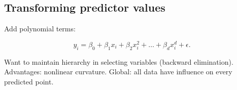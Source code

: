 \subsection{Transforming predictor values}

Add polynomial terms:

\[
y_i = \beta_0 + \beta_1 x_i + \beta_2 x_i^2 + \ldots + \beta_d x_i^d + \epsilon.
\]

Want to maintain hierarchy in selecting variables (backward elimination). Advantages: nonlinear curvature. Global: all data have influence on every predicted point.

 
%
%
%
%


%